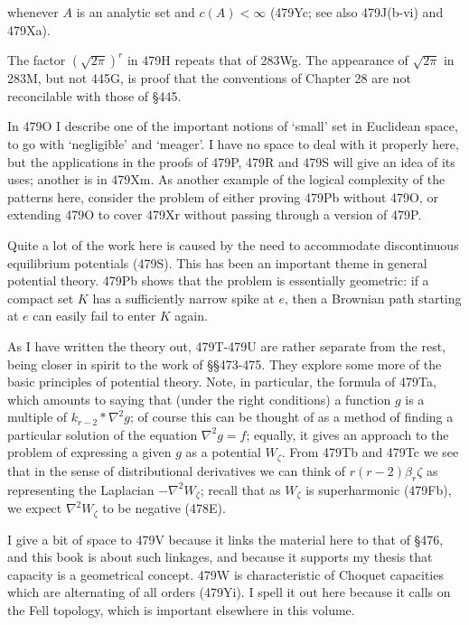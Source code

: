 {

\noindent whenever $A$ is an analytic set and $c(A)<\infty$ (479Yc; see
also 479J(b-vi) and 479Xa).

The factor $(\sqrt{2\pi})^r$ in 479H repeats that of
283Wg.   The
appearance of $\sqrt{2\pi}$ in 283M, but not 445G, is proof that
the conventions of Chapter 28 are not reconcilable with those of
\S445.

In 479O I describe one of the important notions of `small' set in
Euclidean space, to go with `negligible' and `meager'.   I have no space to
deal with it properly here,
but the applications in the proofs of 479P, 479R
and 479S will give an idea of its uses;  another is in 479Xm.   As another
example of the logical complexity of the patterns here, consider the
problem of either proving 479Pb without 479O, or extending 479O to cover
479Xr without passing through a version of 479P.

Quite a lot of the work here is caused by the need to accommodate
discontinuous equilibrium potentials (479S).   This has been an
important theme in general potential theory.   479Pb shows that
the problem is essentially geometric:  if a compact set $K$ has a
sufficiently narrow spike at $e$, then a Brownian path starting at $e$ can
easily fail to enter $K$ again.

As I have written the theory out, 479T-479U are rather separate from the
rest, being closer in spirit to the work of \S\S473-475.   They explore
some more of the basic principles of potential theory.   Note, in
particular, the formula of 479Ta, which amounts to saying that (under the
right conditions) a function $g$ is a multiple of $k_{r-2}*\nabla^2g$;
of course this can be thought of as a method of finding a
particular solution of the equation $\nabla^2g=f$;  equally, it gives an
approach to the problem of expressing a given $g$ as a potential
$W_{\zeta}$.   From 479Tb and 479Tc we see that in the sense of
distributional
derivatives we can think of $r(r-2)\beta_r\zeta$ as representing
the Laplacian $-\nabla^2W_{\zeta}$;  recall that as $W_{\zeta}$ is
superharmonic (479Fb), we expect $\nabla^2W_{\zeta}$ to be negative (478E).

I give a bit of space to 479V because it links the material here to that of
\S476, and this book is about such linkages, and because it supports
my thesis that capacity is a geometrical concept.
479W is characteristic of
Choquet capacities which are alternating of all orders (479Yi).
I spell it out
here because it calls on the Fell topology, which is important
elsewhere in this volume.

}
